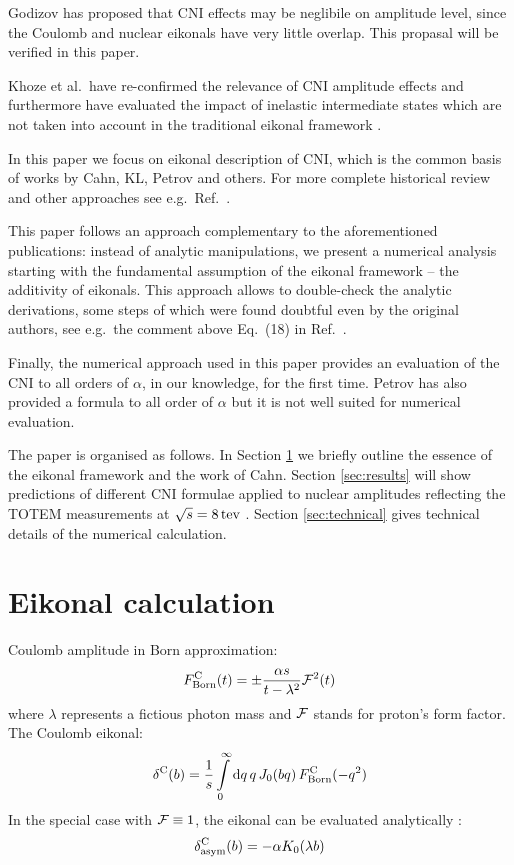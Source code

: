 \documentclass[pdftex,twocolumn,epjc3]{svjour3}
\def\d{{\rm d}}
\def\un#1{\,{\rm #1}}
\begin{document}
Godizov has proposed that CNI effects may be neglibile on amplitude level, since the Coulomb and nuclear eikonals have very little overlap\cite{godizov2019}. This propasal will be verified in this paper.

Khoze et al.~have re-confirmed the relevance of CNI amplitude effects and furthermore have evaluated the impact of inelastic intermediate states which are not taken into account in the traditional eikonal framework \cite{kmr2019}.

In this paper we focus on eikonal description of CNI, which is the common basis of works by Cahn, KL, Petrov and others. For more complete historical review and other approaches see e.g.~Ref.~\cite{thesis}.

This paper follows an approach complementary to the aforementioned publications: instead of analytic manipulations, we present a numerical analysis starting with the fundamental assumption of the eikonal framework -- the additivity of eikonals. This approach allows to double-check the analytic derivations, some steps of which were found doubtful even by the original authors, see e.g.~the comment above Eq.~(18) in Ref.~\cite{cahn82}.

Finally, the numerical approach used in this paper provides an evaluation of the CNI to all orders of $\alpha$, in our knowledge, for the first time. Petrov has also provided a formula to all order of $\alpha$ \cite{petrov2018} but it is not well suited for numerical evaluation.

The paper is organised as follows. In Section \ref{sec:eikonal} we briefly outline the essence of the eikonal framework and the work of Cahn. Section \ref{sec:results} will show predictions of different CNI formulae applied to nuclear amplitudes reflecting the TOTEM measurements at $\sqrt s = 8\un{tev}$ \cite{totem-8tev-1km}. Section \ref{sec:technical} gives technical details of the numerical calculation.




\section{Eikonal calculation}
\label{sec:eikonal}

Coulomb amplitude in Born approximation:
\begin{equation}
F^{\rm C}_{\rm Born}(t) = \pm {\alpha s\over t - \lambda^2} {\cal F}^2(t)
\label{eq:F C Born}
\end{equation}
where $\lambda$ represents a fictious photon mass and ${\cal F}$ stands for proton's form factor. The Coulomb eikonal:
\begin{equation}
\delta^{\rm C}(b) = {1\over s} \int\limits_0^\infty \d q\, q\, J_0(bq)\, F^{\rm C}_{\rm Born}(-q^2)
\label{eq:de C}
\end{equation}
In the special case with ${\cal F} \equiv 1$, the eikonal can be evaluated analytically \cite{cahn82}:
\begin{equation}
\delta^{\rm C}_{\rm asym}(b) = -\alpha K_0(\lambda b)
\label{eq:de C asym}
\end{equation}
\end{document}

